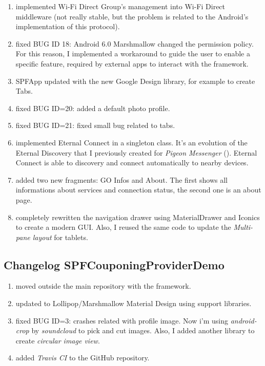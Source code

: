 \begin{enumerate}
	\item implemented Wi-Fi Direct Group's management into Wi-Fi Direct middleware (not really stable, but the problem is related to the Android's implementation of this protocol).
	\item fixed BUG ID 18: Android 6.0 Marshmallow changed the permission policy. For this reason, I implemented a workaround to guide the user to enable a specific feature, required by external apps to interact with the framework.
	\item \textsf{SPFApp} updated with the new Google Design library, for example to create Tabs.
	\item fixed BUG ID=20: added a default photo profile.
	\item fixed BUG ID=21: fixed small bug related to tabs.
	\item implemented \textsf{Eternal Connect} in a singleton class. It's an evolution of the \textsf{Eternal Discovery} that I previously created for \emph{Pigeon Messenger} (). \textsf{Eternal Connect} is able to discovery and connect automatically to nearby devices.
	\item added two new fragments: \textsf{GO Infos} and \textsf{About}. The first shows all informations about services and connection status, the second one is an about page.
	\item completely rewritten the navigation drawer using \textsf{MaterialDrawer} and \textsf{Iconics} to create a modern GUI. Also, I reused the same code to update the \emph{Multi-pane layout} for tablets.
\end{enumerate}

\subsection*{Changelog SPFCouponingProviderDemo}
\begin{enumerate}
	\item moved outside the main repository with the framework.
	\item updated to Lollipop/Marshmallow Material Design using support libraries.
	\item fixed BUG ID=3: crashes related with profile image. Now i'm using \emph{android-crop} by \emph{soundcloud} to pick and cut images. Also, I added another library to create \emph{circular image view}.	
	\item added \emph{Travis CI} to the GitHub repository.
\end{enumerate}

